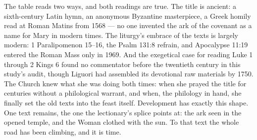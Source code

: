 \noindent The table reads two ways, and both readings are true. The title is
ancient: a sixth-century Latin hymn, an anonymous Byzantine masterpiece, a
Greek homily read at Roman Matins from 1568 --- no one invented the ark of
the covenant as a name for Mary in modern times. The liturgy's embrace of the
texts is largely modern: 1 Paralipomenon 15--16, the Psalm 131:8 refrain, and
Apocalypse 11:19 entered the Roman Mass only in 1969. And the exegetical
case for reading Luke 1 through 2 Kings 6 found no commentator before the
twentieth century in this study's audit, though Liguori had assembled its
devotional raw materials by 1750. The Church knew what she was doing both
times: when she prayed the title for centuries without a philological
warrant, and when, the philology in hand, she finally set the old texts into
the feast itself. Development has exactly this shape. One text remains, the
one the lectionary's splice points at: the ark seen in the opened temple,
and the Woman clothed with the sun. To that text the whole road has been
climbing, and it is time.
